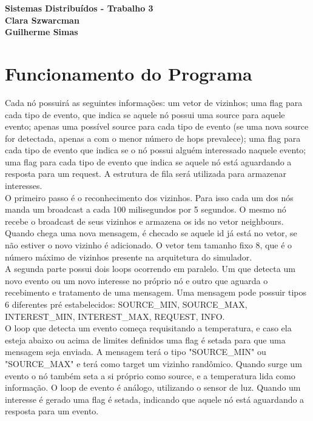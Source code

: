 \documentclass{article}
\begin{document}
\begin{flushleft}
\textbf{\Large{Sistemas Distribuídos - Trabalho 3}}\\
\vspace*{1cm}
\textbf{\large{Clara Szwarcman}}\\
\vspace*{0.25cm}
\textbf{\large{Guilherme Simas}}\\
\end{flushleft}


\section*{Funcionamento do Programa}

	\tab Cada nó possuirá as seguintes informações: um vetor de vizinhos; uma flag para cada tipo de evento, que indica se aquele nó possui uma source para aquele evento; apenas uma possível source para cada tipo de evento (se uma nova source for detectada, apenas a com o menor número de hops prevalece); uma flag para cada tipo de evento que indica se o nó possui alguém interessado naquele evento; uma flag para cada tipo de evento que indica se aquele nó está aguardando a resposta para um request. A estrutura de fila será utilizada para armazenar interesses.\\

	O primeiro passo é o reconhecimento dos vizinhos. Para isso cada um dos nós manda um broadcast a cada 100 milisegundos por 5 segundos. O mesmo nó recebe o broadcast de seus vizinhos e armazena os ids no vetor neighbours. Quando chega uma nova mensagem, é checado se aquele id já está no vetor, se não estiver o novo vizinho é adicionado. O vetor tem tamanho fixo 8, que é o número máximo de vizinhos presente na arquitetura do simulador.\\
	
		A segunda parte possui dois loops ocorrendo em paralelo. Um que detecta um novo evento ou um novo interesse no próprio nó e outro que aguarda o recebimento e tratamento de uma mensagem. Uma mensagem pode possuir tipos 6 diferentes pré estabelecidos: SOURCE\_MIN, SOURCE\_MAX, INTEREST\_MIN, INTEREST\_MAX, REQUEST, INFO. \\
		
		O loop que detecta um evento começa requisitando a temperatura, e caso ela esteja abaixo ou acima de limites definidos uma flag é setada para que uma mensagem seja enviada. A mensagem terá o tipo "SOURCE\_MIN" ou "SOURCE\_MAX" e terá como target um vizinho randômico. Quando surge um evento o nó também seta a si próprio como source, e a temperatura lida como informação. O loop de evento é análogo, utilizando o sensor de luz. Quando um interesse é gerado uma flag é setada, indicando que aquele nó está aguardando a resposta para um evento.\\
		
\end{document}
